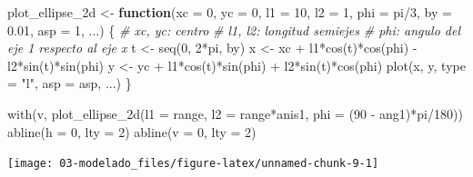 \documentclass[
  spanish,
]{book}
\newenvironment{Shaded}{\begin{snugshade}}{\end{snugshade}}
\newcommand{\AttributeTok}[1]{\textcolor[rgb]{0.77,0.63,0.00}{#1}}
\newcommand{\CommentTok}[1]{\textcolor[rgb]{0.56,0.35,0.01}{\textit{#1}}}
\newcommand{\ControlFlowTok}[1]{\textcolor[rgb]{0.13,0.29,0.53}{\textbf{#1}}}
\newcommand{\DecValTok}[1]{\textcolor[rgb]{0.00,0.00,0.81}{#1}}
\newcommand{\FloatTok}[1]{\textcolor[rgb]{0.00,0.00,0.81}{#1}}
\newcommand{\FunctionTok}[1]{\textcolor[rgb]{0.00,0.00,0.00}{#1}}
\newcommand{\NormalTok}[1]{#1}
\newcommand{\OtherTok}[1]{\textcolor[rgb]{0.56,0.35,0.01}{#1}}
\newcommand{\SpecialCharTok}[1]{\textcolor[rgb]{0.00,0.00,0.00}{#1}}
\newcommand{\StringTok}[1]{\textcolor[rgb]{0.31,0.60,0.02}{#1}}
\theoremstyle{break}
\theoremstyle{definition}
\theoremstyle{definition}
\theoremstyle{definition}
\theoremstyle{definition}
\theoremstyle{remark}
\begin{document}
\begin{Shaded}
\begin{Highlighting}[]
\NormalTok{plot\_ellipse\_2d }\OtherTok{\textless{}{-}} \ControlFlowTok{function}\NormalTok{(}\AttributeTok{xc =} \DecValTok{0}\NormalTok{, }\AttributeTok{yc =} \DecValTok{0}\NormalTok{, }\AttributeTok{l1 =} \DecValTok{10}\NormalTok{, }\AttributeTok{l2 =} \DecValTok{1}\NormalTok{, }\AttributeTok{phi =}\NormalTok{ pi}\SpecialCharTok{/}\DecValTok{3}\NormalTok{, }
                            \AttributeTok{by =} \FloatTok{0.01}\NormalTok{, }\AttributeTok{asp =} \DecValTok{1}\NormalTok{, ...) \{}
    \CommentTok{\# xc, yc: centro}
    \CommentTok{\# l1, l2: longitud semiejes}
    \CommentTok{\# phi: angulo del eje 1 respecto al eje x}
\NormalTok{    t }\OtherTok{\textless{}{-}} \FunctionTok{seq}\NormalTok{(}\DecValTok{0}\NormalTok{, }\DecValTok{2}\SpecialCharTok{*}\NormalTok{pi, by)}
\NormalTok{    x }\OtherTok{\textless{}{-}}\NormalTok{ xc }\SpecialCharTok{+}\NormalTok{ l1}\SpecialCharTok{*}\FunctionTok{cos}\NormalTok{(t)}\SpecialCharTok{*}\FunctionTok{cos}\NormalTok{(phi) }\SpecialCharTok{{-}}\NormalTok{ l2}\SpecialCharTok{*}\FunctionTok{sin}\NormalTok{(t)}\SpecialCharTok{*}\FunctionTok{sin}\NormalTok{(phi)}
\NormalTok{    y }\OtherTok{\textless{}{-}}\NormalTok{ yc }\SpecialCharTok{+}\NormalTok{ l1}\SpecialCharTok{*}\FunctionTok{cos}\NormalTok{(t)}\SpecialCharTok{*}\FunctionTok{sin}\NormalTok{(phi) }\SpecialCharTok{+}\NormalTok{ l2}\SpecialCharTok{*}\FunctionTok{sin}\NormalTok{(t)}\SpecialCharTok{*}\FunctionTok{cos}\NormalTok{(phi)}
    \FunctionTok{plot}\NormalTok{(x, y, }\AttributeTok{type =} \StringTok{"l"}\NormalTok{, }\AttributeTok{asp =}\NormalTok{ asp, ...)}
\NormalTok{\}}

\FunctionTok{with}\NormalTok{(v, }\FunctionTok{plot\_ellipse\_2d}\NormalTok{(}\AttributeTok{l1 =}\NormalTok{ range, }\AttributeTok{l2 =}\NormalTok{ range}\SpecialCharTok{*}\NormalTok{anis1, }
                        \AttributeTok{phi =}\NormalTok{ (}\DecValTok{90} \SpecialCharTok{{-}}\NormalTok{ ang1)}\SpecialCharTok{*}\NormalTok{pi}\SpecialCharTok{/}\DecValTok{180}\NormalTok{))}
\FunctionTok{abline}\NormalTok{(}\AttributeTok{h =} \DecValTok{0}\NormalTok{, }\AttributeTok{lty =} \DecValTok{2}\NormalTok{)}
\FunctionTok{abline}\NormalTok{(}\AttributeTok{v =} \DecValTok{0}\NormalTok{, }\AttributeTok{lty =} \DecValTok{2}\NormalTok{)}
\end{Highlighting}
\end{Shaded}

\begin{center}\texttt{[image: 03-modelado\_files/figure-latex/unnamed-chunk-9-1]} \end{center}
\end{document}
